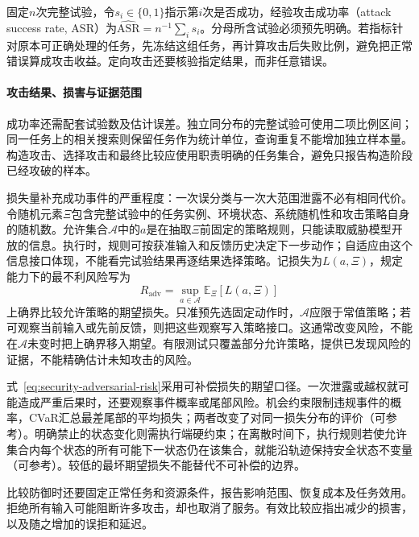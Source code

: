 固定$n$次完整试验，令$s_i\in\{0,1\}$指示第$i$次是否成功，经验攻击成功率（attack success rate, ASR）为$\widehat{\mathrm{ASR}}=n^{-1}\sum_i s_i$。分母所含试验必须预先明确。若指标针对原本可正确处理的任务，先冻结这组任务，再计算攻击后失败比例，避免把正常错误算成攻击收益。定向攻击还要核验指定结果，而非任意错误。

\paragraph{攻击结果、损害与证据范围}

成功率还需配套试验数及估计误差。独立同分布的完整试验可使用二项比例区间；同一任务上的相关搜索则保留任务作为统计单位，查询重复不能增加独立样本量。构造攻击、选择攻击和最终比较应使用职责明确的任务集合，避免只报告构造阶段已经攻破的样本。

损失量补充成功事件的严重程度：一次误分类与一次大范围泄露不必有相同代价。令随机元素$\Xi$包含完整试验中的任务实例、环境状态、系统随机性和攻击策略自身的随机数。允许集合$\mathcal A$中的$a$是在抽取$\Xi$前固定的策略规则，只能读取威胁模型开放的信息。执行时，规则可按获准输入和反馈历史决定下一步动作；自适应由这个信息接口体现，不能看完试验结果再逐结果选择策略。记损失为$L(a,\Xi)$，规定能力下的最不利风险写为
\begin{equation}
 R_{\mathrm{adv}}=\sup_{a\in\mathcal A}
 \mathbb E_{\Xi}[L(a,\Xi)]
 \label{eq:security-adversarial-risk}
\end{equation}
上确界比较允许策略的期望损失。只准预先选固定动作时，$\mathcal A$应限于常值策略；若可观察当前输入或先前反馈，则把这些观察写入策略接口。这通常改变风险，不能在$\mathcal A$未变时把上确界移入期望。有限测试只覆盖部分允许策略，提供已发现风险的证据，不能精确估计未知攻击的风险。

式~\eqref{eq:security-adversarial-risk}采用可补偿损失的期望口径。一次泄露或越权就可能造成严重后果时，还要观察事件概率或尾部风险。机会约束限制违规事件的概率，CVaR汇总最差尾部的平均损失；两者改变了对同一损失分布的评价（可参考）。明确禁止的状态变化则需执行端硬约束；在离散时间下，执行规则若使允许集合内每个状态的所有可能下一状态仍在该集合，就能沿轨迹保持安全状态不变量（可参考）。较低的最坏期望损失不能替代不可补偿的边界。

比较防御时还要固定正常任务和资源条件，报告影响范围、恢复成本及任务效用。拒绝所有输入可能阻断许多攻击，却也取消了服务。有效比较应指出减少的损害，以及随之增加的误拒和延迟。

